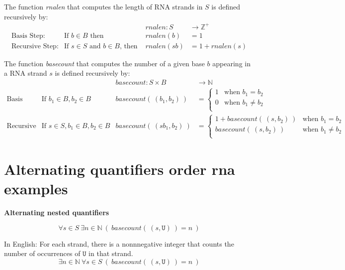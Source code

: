 \documentclass[12pt, oneside]{article}
\newcommand{\U}[0]{\texttt{U}}
\begin{document}
The function \textit{rnalen} that computes the length of RNA strands in $S$ is defined recursively by:
\[
\begin{array}{llll}
& & \textit{rnalen} : S & \to \mathbb{Z}^+ \\
\textrm{Basis Step:} & \textrm{If } b \in B\textrm{ then } & \textit{rnalen}(b) & = 1 \\
\textrm{Recursive Step:} & \textrm{If } s \in S\textrm{ and }b \in B\textrm{, then  } & \textit{rnalen}(sb) & = 1 + \textit{rnalen}(s)
\end{array}
\]

The function \textit{basecount} that computes the number of a given base 
$b$ appearing in a RNA strand $s$ is defined recursively by:
\[
\begin{array}{llll}
& & \textit{basecount} : S \times B & \to \mathbb{N} \\
\textrm{Basis Step:} &  \textrm{If } b_1 \in B, b_2 \in B & \textit{basecount}(~(b_1, b_2)~) & =
        \begin{cases}
            1 & \textrm{when } b_1 = b_2 \\
            0 & \textrm{when } b_1 \neq b_2 \\
        \end{cases} \\
\textrm{Recursive Step:} & \textrm{If } s \in S, b_1 \in B, b_2 \in B &\textit{basecount}(~(s b_1, b_2)~) & =
        \begin{cases}
            1 + \textit{basecount}(~(s, b_2)~) & \textrm{when } b_1 = b_2 \\
            \textit{basecount}(~(s, b_2)~) & \textrm{when } b_1 \neq b_2 \\
        \end{cases}
\end{array}
\] \vfill
\section*{Alternating quantifiers order rna examples}


{\bf Alternating nested quantifiers}



$$\forall s \in S ~\exists n \in \mathbb{N} ~(~basecount(~(s,\U)~) = n~)$$

In English: For each strand, there is a nonnnegative integer that counts the number of occurrences of $\U$ in that 
strand.\\

$$\exists n \in \mathbb{N} ~\forall s \in S ~(~basecount(~(s,\U)~) = n~)$$
\end{document}

